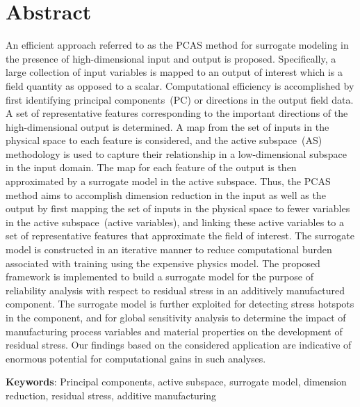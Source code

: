 \section*{Abstract}

An efficient approach referred to as the PCAS method for surrogate modeling in the presence of
high-dimensional input and output is proposed. Specifically, a large
collection of input variables is mapped to an output of interest which is a field quantity as opposed
to a scalar.
Computational efficiency is accomplished by first identifying principal components~(PC)
or directions in  the output field data. A set of representative features corresponding to the important directions
of the high-dimensional output is 
determined. A map from the set of inputs in the physical space to each feature is considered,
and the active subspace~(AS) methodology is used to capture their relationship in a low-dimensional subspace in the input 
domain. The map for each feature of the output is then approximated by a surrogate model in the active subspace. Thus, the PCAS
method aims to accomplish dimension reduction in the input as well as the output by first mapping the set of inputs
in the physical space to fewer variables in the active subspace~(active variables), and linking these active variables
to a set of representative features
that approximate the field of interest. 
The surrogate model is constructed in an iterative manner to reduce computational burden
associated with training using the expensive physics model. 
The proposed framework is implemented to build a surrogate model for the purpose of reliability analysis
with respect to residual stress in an additively
manufactured component. The surrogate model is further exploited for detecting 
stress hotspots in the component, and for global sensitivity analysis to determine the impact of manufacturing process variables and
material properties on the development of residual stress. Our findings based on the considered application
are indicative of enormous potential for computational gains in such analyses. 

\bigskip

\noindent \textbf{Keywords}: Principal components, active subspace, surrogate model, dimension reduction,
residual stress, additive manufacturing
